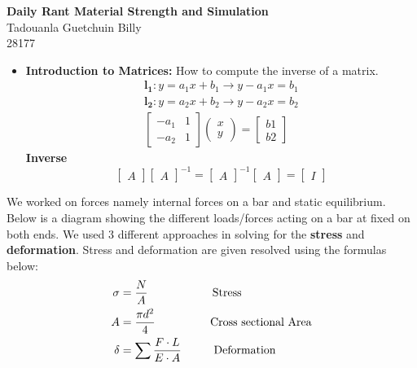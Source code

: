 \documentclass[11pt, a4paper]{article}
\begin{document}
\begin{center}
  \LARGE\textbf{Daily Rant Material Strength and Simulation}\\
  Tadouanla Guetchuin Billy\\
  28177
\end{center}

\begin{itemize}
  \item \textbf{Introduction to Matrices:} How to compute the inverse of a matrix.
        \begin{align*}
          \mathbf{l_1}: y = a_1x + b_1 \rightarrow y - a_1x  = b_1 \\
          \mathbf{l_2}: y = a_2x + b_2  \rightarrow y - a_2x = b_2 \\
          \begin{bmatrix}
            -a_1 & 1 \\
            -a_2 & 1
          \end{bmatrix}
          \begin{pmatrix}
            x \\
            y
          \end{pmatrix}
          =
          \begin{bmatrix}
            b1 \\
            b2
          \end{bmatrix}
        \end{align*}
        \textbf{Inverse}
        $$
          \begin{bmatrix}
            A
          \end{bmatrix}
          \begin{bmatrix}
            A
          \end{bmatrix}^{-1} =
          \begin{bmatrix}
            A
          \end{bmatrix}^{-1}
          \begin{bmatrix}
            A
          \end{bmatrix} =
          \begin{bmatrix}
            I
          \end{bmatrix}
        $$

\end{itemize}
We worked on forces namely internal forces on a bar and static equilibrium. Below is a diagram
showing the different loads/forces acting on a bar at fixed on both ends. We used 3 different
approaches in solving for the \textbf{stress} and \textbf{deformation}. Stress and deformation
are given resolved using the formulas below:
\begin{align*}
  \sigma & = \frac{N}{A}\hspace{2cm} \text{Stress}                           \\
  A      & = \frac{\pi d^2}{4} \hspace{1.7cm} \text{Cross sectional Area}    \\
  \delta & = \sum\frac{F\cdot L}{E\cdot A} \hspace{1.0cm} \text{Deformation}
\end{align*}
\end{document}
